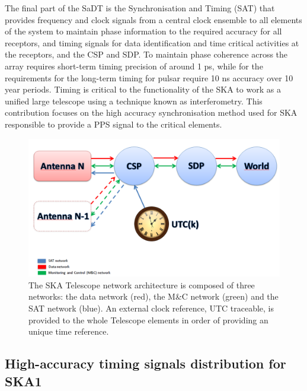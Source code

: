 The final part of the SaDT is the Synchronisation and Timing (SAT) that provides frequency and clock signals from a central clock ensemble to all elements of the system to maintain phase information to the required accuracy for all receptors, and timing signals for data identification and time critical activities at the receptors, and the CSP and SDP. To maintain phase coherence across the array requires short-term timing precision of around 1 ps, while for the requirements for the long-term timing for pulsar require 10 ns accuracy over 10 year periods. Timing is critical to the functionality of the SKA to work as a unified large telescope using a technique known as interferometry. This contribution focuses on the high accuracy synchronisation method used for SKA responsible to provide a PPS signal to the critical elements. 

\begin{figure}[H]
	\centering
	\includegraphics[scale=0.4]{img/ska_network_arch}
	\caption{The SKA Telescope network architecture is composed of three networks: the data network (red), the M\&C network (green) and the SAT network (blue). An external clock reference, UTC traceable, is provided to the whole Telescope elements in order of providing an unique time reference.}
	\label{fig:ska_net_arch1}
\end{figure}

\subsection{High-accuracy timing signals distribution for SKA1} \label{subsec:ska-distribution}

